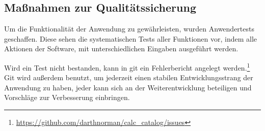 \subsection{Maßnahmen zur Qualitätssicherung}
\label{sec:Qualitaetssicherung}
Um die Funktionalität der Anwendung zu gewährleisten, wurden Anwendertests
geschaffen. Diese sehen die systematischen Tests aller Funktionen vor, indem
alle Aktionen der Software, mit unterschiedlichen Eingaben ausgeführt
werden.

Wird ein Test nicht bestanden, kann in git ein Fehlerbericht angelegt
werden.\footnote{\url{https://github.com/darthnorman/calc_catalog/issues}} Git
wird außerdem benutzt, um jederzeit einen stabilen Entwicklungsstrang der
Anwendung zu haben, jeder kann sich an der Weiterentwicklung beteiligen und
Vorschläge zur Verbesserung einbringen.
